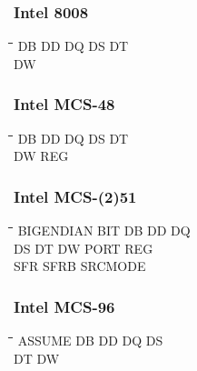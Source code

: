 \subsubsection{Intel 8008}
{\tt\begin{tabbing}
\hspace{3cm}\=\hspace{3cm}\=\hspace{3cm}\=\hspace{3cm}\=\kill    
DB         \> DD          \> DQ          \> DS          \> DT \\
DW \\
\end{tabbing}}

\subsubsection{Intel MCS-48}
{\tt\begin{tabbing}
\hspace{3cm}\=\hspace{3cm}\=\hspace{3cm}\=\hspace{3cm}\=\kill
DB         \> DD          \> DQ          \> DS          \> DT \\
DW         \> REG \\
\end{tabbing}}

\subsubsection{Intel MCS-(2)51}
{\tt\begin{tabbing}
\hspace{3cm}\=\hspace{3cm}\=\hspace{3cm}\=\hspace{3cm}\=\kill
BIGENDIAN  \> BIT         \> DB          \> DD          \> DQ \\
DS         \> DT          \> DW          \> PORT        \> REG \\
SFR        \> SFRB        \> SRCMODE \\
\end{tabbing}}

\subsubsection{Intel MCS-96}
{\tt\begin{tabbing}
\hspace{3cm}\=\hspace{3cm}\=\hspace{3cm}\=\hspace{3cm}\=\kill
ASSUME     \> DB          \> DD          \> DQ          \> DS \\
DT         \> DW \\
\end{tabbing}}
 
